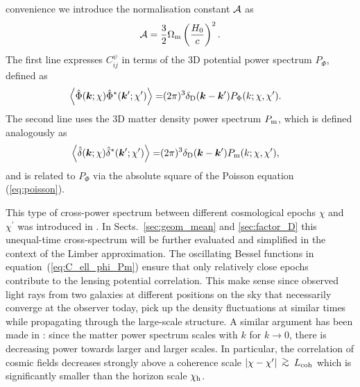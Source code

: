 \documentclass[fleqn,usenatbib]{mnras} %
\newcommand{\pref}{{\cal A}}
\renewcommand{\vec}{\bm}
\newcommand{\ontop}[2]{
  \renewcommand{\arraystretch}{0.2}
  \begin{array}{c}
  #1 \\ #2
  \end{array}
  \renewcommand{\arraystretch}{1.0}
}
\newcommand{\gsim}{\ontop{>}{\sim}}
\begin{document}
convenience we introduce the normalisation constant $\pref$ as
%
\begin{equation}
  \pref = \frac 3 2 \Omega_{\rm m} \left(\frac{H_0} c\right)^2.
  \label{eq:pref}
\end{equation}
%
The first line expresses $C_{ij}^\psi$ in terms of the 3D potential power spectrum $P_\Phi$, defined as
%
\begin{align}
  \left\langle \hat \Phi(\vec k; \chi) \hat \Phi^\ast(\vec k^\prime; \chi^\prime) \right\rangle
    = & (2\pi)^3 \delta_{\rm D}(\vec k - \vec k^\prime) P_\Phi(k; \chi, \chi^\prime).
  \label{eq:p_phi}
\end{align}
%
The second line uses the 3D matter density power spectrum $P_{\rm m}$, which is defined analogously as
%
\begin{align}
  \left\langle \hat \delta(\vec k; \chi) \hat \delta^\ast(\vec k^\prime; \chi^\prime) \right\rangle
    = & (2\pi)^3 \delta_{\rm D}(\vec k - \vec k^\prime) P_{\rm m}(k; \chi, \chi^\prime),
  \label{eq:p_m}
\end{align}
%
and is related to $P_\Phi$ via the absolute square of the Poisson equation
(\ref{eq:poisson}).

This type of cross-power spectrum between different cosmological epochs
$\chi$ and $\chi^\prime$ was introduced in \cite{2005PhRvD..72b3516C}. In
Sects.~\ref{sec:geom_mean} and \ref{sec:factor_D} this unequal-time
cross-spectrum \citep{2016arXiv161200770K} will be further evaluated and
simplified in the context of the Limber approximation. The oscillating Bessel
functions in equation~(\ref{eq:C_ell_phi_Pm}) ensure that only relatively close epochs
contribute to the lensing potential correlation. This make sense since observed
light rays from two galaxies at different positions on the sky that necessarily
converge at the observer today, pick up the density fluctuations at similar
times while propagating through the large-scale structure. A similar argument
has been made in \cite{BS01}: since the matter power spectrum scales with $k$
for $k \rightarrow 0$, there is decreasing power towards larger and larger
scales. In particular, the correlation of cosmic fields decreases strongly
above a coherence scale $|\chi - \chi^\prime| \gsim L_{\rm coh}$ which is significantly
smaller than the horizon scale $\chi_{\rm h}$.
\end{document}
